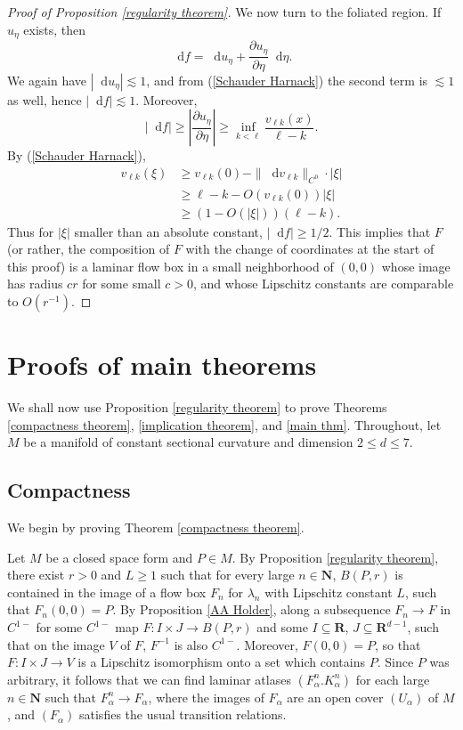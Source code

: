 \documentclass[reqno,11pt]{amsart}
\newcommand{\NN}{\mathbf{N}}
\newcommand{\RR}{\mathbf{R}}
\newcommand*\dif{\mathop{}\!\mathrm{d}}
\theoremstyle{definition}
\numberwithin{equation}{section}
\begin{document}
\begin{proof}[Proof of Proposition \ref{regularity theorem}]
We now turn to the foliated region. If $u_\eta$ exists, then
$$\dif f = \dif u_\eta + \frac{\partial u_\eta}{\partial \eta} \dif \eta.$$
We again have $|\dif u_\eta| \lesssim 1$, and from (\ref{Schauder Harnack}) the second term is $\lesssim 1$ as well, hence $|\dif f| \lesssim 1$.
Moreover,
$$|\dif f| \geq \left|\frac{\partial u_\eta}{\partial \eta}\right| \geq \inf_{k < \ell} \frac{v_{\ell k}(x)}{\ell - k}.$$
By (\ref{Schauder Harnack}),
\begin{align*}
	v_{\ell k}(\xi) &\geq v_{\ell k}(0) - \|\dif v_{\ell k}\|_{C^0} \cdot |\xi| \\
	&\geq \ell - k - O(v_{\ell k}(0)) |\xi| \\
	&\geq (1 - O(|\xi|)) (\ell - k).
\end{align*}
Thus for $|\xi|$ smaller than an absolute constant, $|\dif f| \geq 1/2$.
This implies that $F$ (or rather, the composition of $F$ with the change of coordinates at the start of this proof) is a laminar flow box in a small neighborhood of $(0, 0)$ whose image has radius $cr$ for some small $c > 0$, and whose Lipschitz constants are comparable to $O(r^{-1})$.
\end{proof}

\section{Proofs of main theorems}\label{CompactnessSec}
We shall now use Proposition \ref{regularity theorem} to prove Theorems \ref{compactness theorem}, \ref{implication theorem}, and \ref{main thm}.
Throughout, let $M$ be a manifold of constant sectional curvature and dimension $2 \leq d \leq 7$.

\subsection{Compactness}
We begin by proving Theorem \ref{compactness theorem}.

Let $M$ be a closed space form and $P \in M$.
By Proposition \ref{regularity theorem}, there exist $r > 0$ and $L \geq 1$ such that for every large $n \in \NN$, $B(P, r)$ is contained in the image of a flow box $F_n$ for $\lambda_n$ with Lipschitz constant $L$, such that $F_n(0, 0) = P$.
By Proposition \ref{AA Holder}, along a subsequence $F_n \to F$ in $C^{1-}$ for some $C^{1-}$ map $F: I \times J \to B(P, r)$ and some $I \subseteq \RR$, $J \subseteq \RR^{d - 1}$, such that on the image $V$ of $F$, $F^{-1}$ is also $C^{1-}$.
Moreover, $F(0, 0) = P$, so that $F: I \times J \to V$ is a Lipschitz isomorphism onto a set which contains $P$.
Since $P$ was arbitrary, it follows that we can find laminar atlases $(F_\alpha^n. K_\alpha^n)$ for each large $n \in \NN$ such that $F_\alpha^n \to F_\alpha$, where the images of $F_\alpha$ are an open cover $(U_\alpha)$ of $M$, and $(F_\alpha)$ satisfies the usual transition relations.
\end{document}
